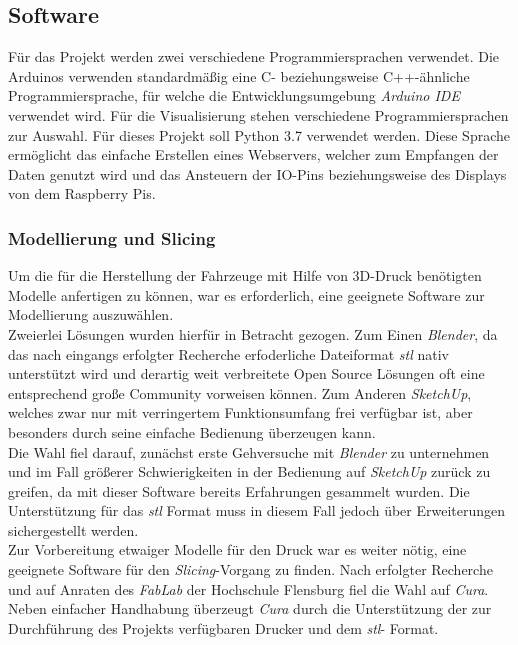 \documentclass[.../Dokumentation.tex]{subfiles}
\begin{document}
    \subsection{Software}\label{sec-components-software}
    Für das Projekt werden zwei verschiedene Programmiersprachen verwendet. 
    Die Arduinos verwenden standardmäßig eine C- beziehungsweise C++-ähnliche 
    Programmiersprache, für welche die Entwicklungsumgebung 
    \textit{Arduino IDE} verwendet wird. 
    Für die Visualisierung stehen verschiedene Programmiersprachen zur Auswahl. 
    Für dieses Projekt soll Python 3.7 verwendet werden. Diese Sprache 
    ermöglicht das einfache Erstellen eines Webservers, welcher zum Empfangen 
    der Daten genutzt wird und das Ansteuern der IO-Pins beziehungsweise des 
    Displays von dem Raspberry Pis.
    
    \subsubsection{Modellierung und Slicing}\label{sec-components-software-model}
    Um die für die Herstellung der Fahrzeuge mit Hilfe von 3D-Druck benötigten 
    Modelle anfertigen zu können, war es erforderlich, eine geeignete Software 
    zur Modellierung auszuwählen.\\
    Zweierlei Lösungen wurden hierfür in Betracht gezogen.
    Zum Einen \textit{Blender}, %
    da das nach eingangs erfolgter Recherche erfoderliche Dateiformat 
    \textit{stl} nativ unterstützt wird und derartig weit verbreitete Open 
    Source Lösungen oft eine entsprechend große Community vorweisen können.
    Zum Anderen \textit{SketchUp}, %
    welches zwar nur mit verringertem 
    Funktionsumfang frei verfügbar ist, aber besonders durch seine einfache 
    Bedienung überzeugen kann.\\
    Die Wahl fiel darauf, zunächst erste Gehversuche mit \textit{Blender} 
    zu unternehmen und im Fall größerer Schwierigkeiten in der Bedienung auf 
    \textit{SketchUp} zurück zu greifen, da mit dieser Software bereits 
    Erfahrungen gesammelt wurden. Die Unterstützung für das \textit{stl} Format 
    muss in diesem Fall jedoch über Erweiterungen sichergestellt werden.\\
    Zur Vorbereitung etwaiger Modelle für den Druck war es weiter nötig, 
    eine geeignete Software für den \textit{Slicing}-Vorgang zu finden.
    Nach erfolgter Recherche und auf Anraten des \textit{FabLab} der Hochschule 
    Flensburg fiel die Wahl auf \textit{Cura}. %
    Neben einfacher Handhabung überzeugt \textit{Cura} durch die Unterstützung 
    der zur Durchführung des Projekts verfügbaren Drucker und dem \textit{stl}-
    Format.
\end{document}
